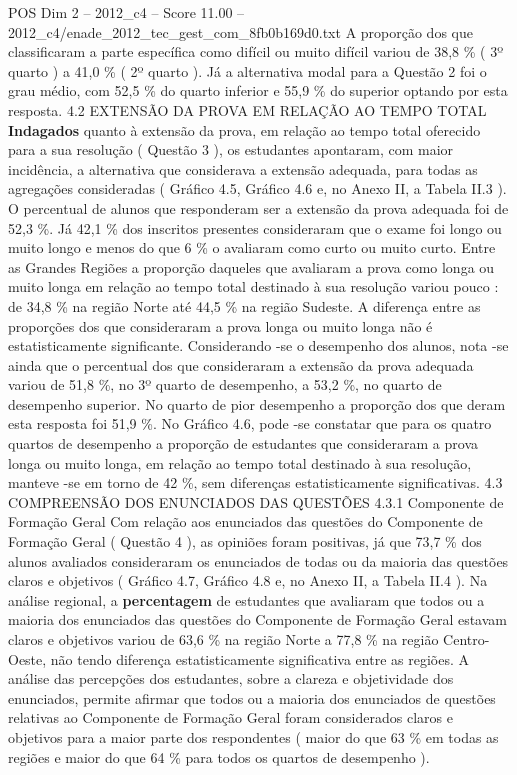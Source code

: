 \begin{textsample}{POS Dim 2 – 2012\_c4 – Score 11.00 – 2012\_c4/enade\_2012\_tec\_gest\_com\_8fb0b169d0.txt}
A proporção dos que classificaram a parte específica como difícil ou muito difícil variou de 38,8 \% ( 3º quarto ) a 41,0 \% ( 2º quarto ).
Já a alternativa modal para a Questão 2 foi o grau médio, com 52,5 \% do quarto inferior e 55,9 \% do superior optando por esta resposta. 4.2 EXTENSÃO DA PROVA EM RELAÇÃO AO TEMPO TOTAL \textbf{Indagados} quanto à extensão da prova, em relação ao tempo total oferecido para a sua resolução ( Questão 3 ), os estudantes apontaram, com maior incidência, a alternativa que considerava a extensão adequada, para todas as agregações consideradas ( Gráfico 4.5, Gráfico 4.6 e, no Anexo II, a Tabela II.3 ).
O percentual de alunos que responderam ser a extensão da prova adequada foi de 52,3 \%.
Já 42,1 \% dos inscritos presentes consideraram que o exame foi longo ou muito longo e menos do que 6 \% o avaliaram como curto ou muito curto.
Entre as Grandes Regiões a proporção daqueles que avaliaram a prova como longa ou muito longa em relação ao tempo total destinado à sua resolução variou pouco : de 34,8 \% na região Norte até 44,5 \% na região Sudeste.
A diferença entre as proporções dos que consideraram a prova longa ou muito longa não é estatisticamente significante.
Considerando -se o desempenho dos alunos, nota -se ainda que o percentual dos que consideraram a extensão da prova adequada variou de 51,8 \%, no 3º quarto de desempenho, a 53,2 \%, no quarto de desempenho superior.
No quarto de pior desempenho a proporção dos que deram esta resposta foi 51,9 \%.
No Gráfico 4.6, pode -se constatar que para os quatro quartos de desempenho a proporção de estudantes que consideraram a prova longa ou muito longa, em relação ao tempo total destinado à sua resolução, manteve -se em torno de 42 \%, sem diferenças estatisticamente significativas. 4.3 COMPREENSÃO DOS ENUNCIADOS DAS QUESTÕES 4.3.1 Componente de Formação Geral Com relação aos enunciados das questões do Componente de Formação Geral ( Questão 4 ), as opiniões foram positivas, já que 73,7 \% dos alunos avaliados consideraram os enunciados de todas ou da maioria das questões claros e objetivos ( Gráfico 4.7, Gráfico 4.8 e, no Anexo II, a Tabela II.4 ).
Na análise regional, a \textbf{percentagem} de estudantes que avaliaram que todos ou a maioria dos enunciados das questões do Componente de Formação Geral estavam claros e objetivos variou de 63,6 \% na região Norte a 77,8 \% na região Centro-Oeste, não tendo diferença estatisticamente significativa entre as regiões.
A análise das percepções dos estudantes, sobre a clareza e objetividade dos enunciados, permite afirmar que todos ou a maioria dos enunciados de questões relativas ao Componente de Formação Geral foram considerados claros e objetivos para a maior parte dos respondentes ( maior do que 63 \% em todas as regiões e maior do que 64 \% para todos os quartos de desempenho ).

\end{textsample}
